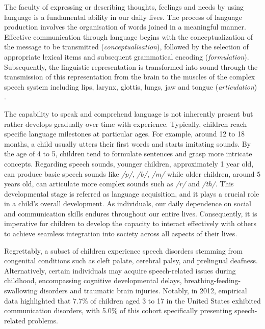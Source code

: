 \cleardoublepage
\label{chapter:1}
The faculty of expressing or describing thoughts, feelings and needs by using language is a fundamental ability in our daily lives. The process of language production involves the organisation of words joined in a meaningful manner. Effective communication through language begins with the conceptualization of the message to be transmitted (\textit{conceptualisation}), followed by the selection of appropriate lexical items and subsequent grammatical encoding (\textit{formulation}). Subsequently, the linguistic representation is transformed into sound through the transmission of this representation from the brain to the muscles of the complex speech system including lips, larynx, glottis, lungs, jaw and tongue (\textit{articulation}) \cite{levelt1993speaking}.

The capability to speak and comprehend language is not inherently present but rather develops gradually over time with experience. Typically, children reach specific language milestones at particular ages. For example, around 12 to 18 months, a child usually utters their first words and starts imitating sounds. By the age of 4 to 5, children tend to formulate sentences and grasp more intricate concepts. Regarding speech sounds, younger children, approximately 1 year old, can produce basic speech sounds like \textit{/p/}, \textit{/b/}, \textit{/m/} while older children, around 5 years old, can articulate more complex sounds such as \textit{/r/} and \textit{/th/}. This developmental stage is referred as language acquisition, and it plays a crucial role in a child's overall development. As individuals, our daily dependence on social and communication skills endures throughout our entire lives. Consequently, it is imperative for children to develop the capacity to interact effectively with others to achieve seamless integration into society across all aspects of their lives.

Regrettably, a subset of children experience speech disorders stemming from congenital conditions such as cleft palate, cerebral palsy, and prelingual deafness. Alternatively, certain individuals may acquire speech-related issues during childhood, encompassing cognitive developmental delays, breathing-feeding-swallowing disorders and traumatic brain injuries. Notably, in 2012, empirical data \cite{black2015communication} highlighted that 7.7\% of children aged 3 to 17 in the United States exhibited communication disorders, with 5.0\% of this cohort specifically presenting speech-related problems.

